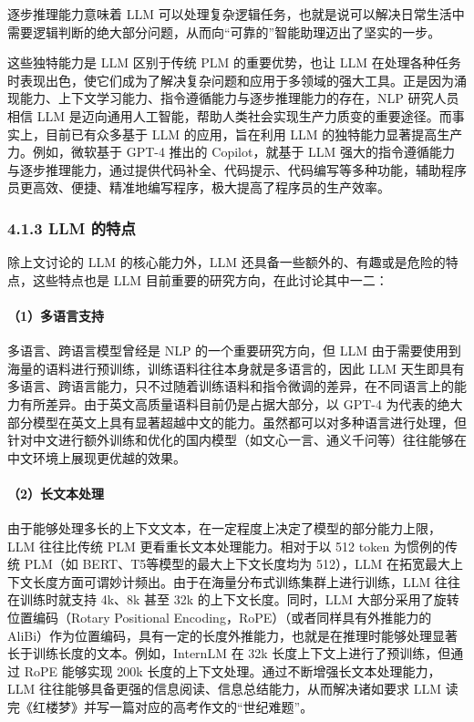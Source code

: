 \documentclass[
]{article}
\begin{document}
逐步推理能力意味着 LLM
可以处理复杂逻辑任务，也就是说可以解决日常生活中需要逻辑判断的绝大部分问题，从而向``可靠的''智能助理迈出了坚实的一步。

这些独特能力是 LLM 区别于传统 PLM 的重要优势，也让 LLM
在处理各种任务时表现出色，使它们成为了解决复杂问题和应用于多领域的强大工具。正是因为涌现能力、上下文学习能力、指令遵循能力与逐步推理能力的存在，NLP
研究人员相信 LLM
是迈向通用人工智能，帮助人类社会实现生产力质变的重要途径。而事实上，目前已有众多基于
LLM 的应用，旨在利用 LLM 的独特能力显著提高生产力。例如，微软基于 GPT-4
推出的 Copilot，就基于 LLM
强大的指令遵循能力与逐步推理能力，通过提供代码补全、代码提示、代码编写等多种功能，辅助程序员更高效、便捷、精准地编写程序，极大提高了程序员的生产效率。

\subsubsection{4.1.3 LLM 的特点}\label{llm-ux7684ux7279ux70b9}

除上文讨论的 LLM 的核心能力外，LLM
还具备一些额外的、有趣或是危险的特点，这些特点也是 LLM
目前重要的研究方向，在此讨论其中一二：

\paragraph{（1）多语言支持}\label{ux591aux8bedux8a00ux652fux6301}

多语言、跨语言模型曾经是 NLP 的一个重要研究方向，但 LLM
由于需要使用到海量的语料进行预训练，训练语料往往本身就是多语言的，因此
LLM
天生即具有多语言、跨语言能力，只不过随着训练语料和指令微调的差异，在不同语言上的能力有所差异。由于英文高质量语料目前仍是占据大部分，以
GPT-4
为代表的绝大部分模型在英文上具有显著超越中文的能力。虽然都可以对多种语言进行处理，但针对中文进行额外训练和优化的国内模型（如文心一言、通义千问等）往往能够在中文环境上展现更优越的效果。

\paragraph{（2）长文本处理}\label{ux957fux6587ux672cux5904ux7406}

由于能够处理多长的上下文文本，在一定程度上决定了模型的部分能力上限，LLM
往往比传统 PLM 更看重长文本处理能力。相对于以 512 token 为惯例的传统
PLM（如 BERT、T5等模型的最大上下文长度均为 512），LLM
在拓宽最大上下文长度方面可谓妙计频出。由于在海量分布式训练集群上进行训练，LLM
往往在训练时就支持 4k、8k 甚至 32k 的上下文长度。同时，LLM
大部分采用了旋转位置编码（Rotary Positional
Encoding，RoPE）（或者同样具有外推能力的
AliBi）作为位置编码，具有一定的长度外推能力，也就是在推理时能够处理显著长于训练长度的文本。例如，InternLM
在 32k 长度上下文上进行了预训练，但通过 RoPE 能够实现 200k
长度的上下文处理。通过不断增强长文本处理能力，LLM
往往能够具备更强的信息阅读、信息总结能力，从而解决诸如要求 LLM
读完《红楼梦》并写一篇对应的高考作文的``世纪难题''。
\end{document}
